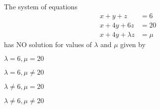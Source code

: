     \item The system of equations
    \begin{align*}
        x+y+z &= 6 \\
        x+4y+6z &= 20 \\
        x+4y+\lambda z &= \mu
    \end{align*}
    has NO solution for values of $\lambda$ and $\mu$ given by
    \begin{enumerate}
        \begin{multicols}{4}
            \item $\lambda=6, \mu=20$
            \item $\lambda=6, \mu \ne 20$
            \item $\lambda \ne 6, \mu=20$
            \item $\lambda \ne 6, \mu \ne 20$
        \end{multicols}
    \end{enumerate}
    \hfill{}
